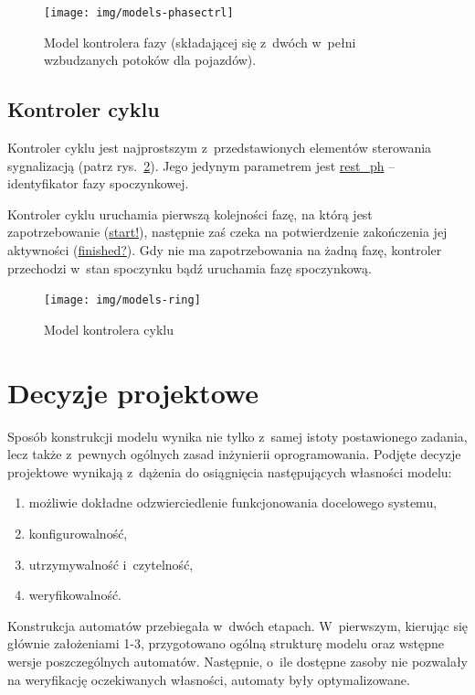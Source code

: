 \documentclass{pracamgr}
\newcommand{\imgr}[1]{rys.~\ref{#1}}
\theoremstyle{plain}
\begin{document}
\begin{figure}
  \centering
  \texttt{[image: img/models-phasectrl]}
  \caption{Model kontrolera fazy (składającej się z~dwóch w~pełni wzbudzanych potoków dla pojazdów).}
  \label{img:phase-ctrl}
\end{figure}

\subsection{Kontroler cyklu}
\label{ss:models:models:ring}
Kontroler cyklu jest najprostszym z~przedstawionych elementów
sterowania sygnalizacją (patrz \imgr{img:ring-ctrl}). Jego jedynym
parametrem jest \url{rest_ph} -- identyfikator fazy spoczynkowej.

Kontroler cyklu uruchamia pierwszą kolejności fazę, na którą
jest zapotrzebowanie (\url{start!}), następnie zaś czeka na
potwierdzenie zakończenia jej aktywności (\url{finished?}). Gdy nie ma
zapotrzebowania na żadną fazę, kontroler przechodzi w~stan spoczynku
bądź uruchamia fazę spoczynkową.

\begin{figure}
  \centering
  \texttt{[image: img/models-ring]}
  \caption{Model kontrolera cyklu}
  \label{img:ring-ctrl}
\end{figure}

\section{Decyzje projektowe}
\label{s:models:project}

Sposób konstrukcji modelu wynika nie tylko z~samej istoty postawionego
zadania, lecz także z~pewnych ogólnych zasad inżynierii
oprogramowania. Podjęte decyzje projektowe wynikają z~dążenia do
osiągnięcia następujących własności modelu:
\begin{enumerate}
  \item możliwie dokładne odzwierciedlenie funkcjonowania docelowego systemu,
  \item konfigurowalność,
  \item utrzymywalność i~czytelność,
  \item weryfikowalność.
\end{enumerate}
Konstrukcja automatów przebiegała w~dwóch etapach. W~pierwszym,
kierując się głównie założeniami 1-3, przygotowano ogólną strukturę
modelu oraz wstępne wersje poszczególnych automatów. Następnie, o~ile
dostępne zasoby nie pozwalały na weryfikację oczekiwanych własności,
automaty były optymalizowane.
\end{document}
